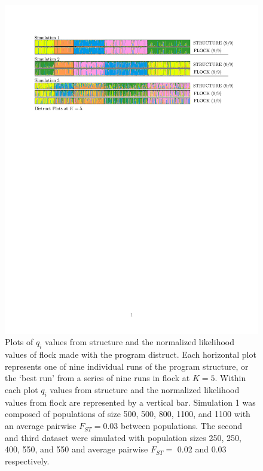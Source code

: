 \begin{figure}
\begin{center}
    \includegraphics[width=\textwidth]{images/Figures-Pat/Simulations_Fig1.pdf}   %
    \caption{Plots of $q_i$ values from {\sc structure} and the normalized likelihood values 
of {\sc flock} made with the program {\sc distruct}. Each horizontal plot represents one of nine individual runs of the program {\sc structure}, or the `best run' from a series of nine runs in {\sc flock} at $K=5$. Within each plot 
$q_i$ values from {\sc structure} and the normalized likelihood values 
from {\sc flock}  are represented by a 
vertical bar. Simulation 1 was composed of populations of 
size 500, 500, 800, 1100, and 1100 with an average pairwise $F_{ST} = 0.03$ between populations. 
The second and third dataset were simulated with population sizes
250, 250, 400, 550, and 550 and average pairwise $F_{ST} =$ 0.02 and 0.03
respectively.}
    \label{fig:Sims}
\end{center}
\end{figure}

